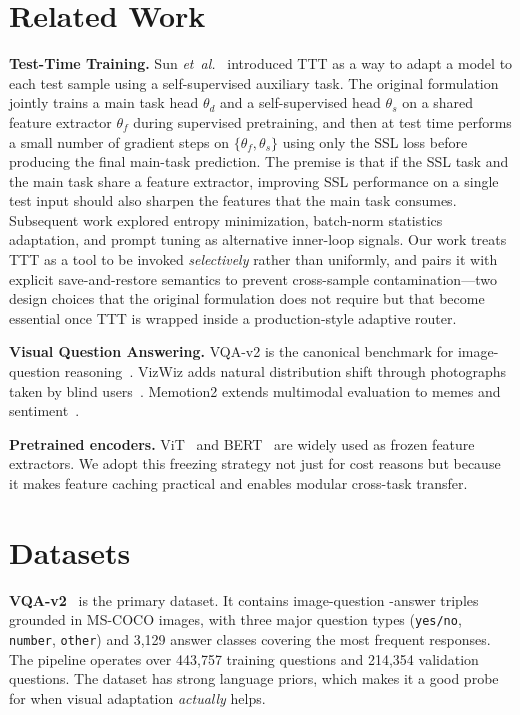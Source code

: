\documentclass[conference]{IEEEtran}
\begin{document}
\section{Related Work}

\textbf{Test-Time Training.} Sun \emph{et~al.}~\cite{b6} introduced TTT as
a way to adapt a model to each test sample using a self-supervised
auxiliary task. The original formulation jointly trains a main task head
$\theta_d$ and a self-supervised head $\theta_s$ on a shared feature
extractor $\theta_f$ during supervised pretraining, and then at test time
performs a small number of gradient steps on $\{\theta_f, \theta_s\}$
using only the SSL loss before producing the final main-task prediction.
The premise is that if the SSL task and the main task share a feature
extractor, improving SSL performance on a single test input should also
sharpen the features that the main task consumes. Subsequent work
explored entropy minimization, batch-norm statistics adaptation, and
prompt tuning as alternative inner-loop signals. Our work treats TTT as a
tool to be invoked \emph{selectively} rather than uniformly, and pairs it
with explicit save-and-restore semantics to prevent cross-sample
contamination---two design choices that the original formulation does
not require but that become essential once TTT is wrapped inside a
production-style adaptive router.

\textbf{Visual Question Answering.} VQA-v2 is the canonical benchmark
for image-question reasoning~\cite{b1}. VizWiz adds natural distribution
shift through photographs taken by blind users~\cite{b2}. Memotion2
extends multimodal evaluation to memes and sentiment~\cite{b3}.

\textbf{Pretrained encoders.} ViT~\cite{b4} and BERT~\cite{b5} are widely
used as frozen feature extractors. We adopt this freezing strategy not
just for cost reasons but because it makes feature caching practical and
enables modular cross-task transfer.

\section{Datasets}

\textbf{VQA-v2}~\cite{b1} is the primary dataset. It contains image-question
-answer triples grounded in MS-COCO images, with three major question
types (\texttt{yes/no}, \texttt{number}, \texttt{other}) and 3{,}129 answer
classes covering the most frequent responses. The pipeline operates over
443{,}757 training questions and 214{,}354 validation questions. The
dataset has strong language priors, which makes it a good probe for when
visual adaptation \emph{actually} helps.
\end{document}
